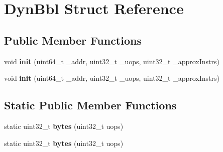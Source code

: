 \hypertarget{structDynBbl}{\section{Dyn\-Bbl Struct Reference}
\label{structDynBbl}
}
\subsection*{Public Member Functions}
\begin{DoxyCompactItemize}
\item 
\hypertarget{structDynBbl_aa2a47443851deb46b1e6cb8005fb5c73}{void {\bfseries init} (uint64\-\_\-t \-\_\-addr, uint32\-\_\-t \-\_\-uops, uint32\-\_\-t \-\_\-approx\-Instrs)}\label{structDynBbl_aa2a47443851deb46b1e6cb8005fb5c73}

\item 
\hypertarget{structDynBbl_aa2a47443851deb46b1e6cb8005fb5c73}{void {\bfseries init} (uint64\-\_\-t \-\_\-addr, uint32\-\_\-t \-\_\-uops, uint32\-\_\-t \-\_\-approx\-Instrs)}\label{structDynBbl_aa2a47443851deb46b1e6cb8005fb5c73}

\end{DoxyCompactItemize}
\subsection*{Static Public Member Functions}
\begin{DoxyCompactItemize}
\item 
\hypertarget{structDynBbl_abb2c7976dbf8ee0f787eb153273172ad}{static uint32\-\_\-t {\bfseries bytes} (uint32\-\_\-t uops)}\label{structDynBbl_abb2c7976dbf8ee0f787eb153273172ad}

\item 
\hypertarget{structDynBbl_abb2c7976dbf8ee0f787eb153273172ad}{static uint32\-\_\-t {\bfseries bytes} (uint32\-\_\-t uops)}\label{structDynBbl_abb2c7976dbf8ee0f787eb153273172ad}

\end{DoxyCompactItemize}
